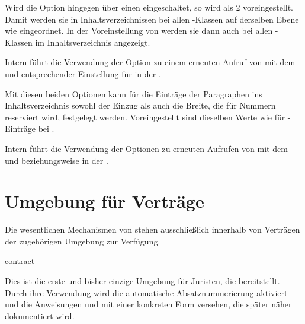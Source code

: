 Wird die Option hingegen über einen
 eingeschaltet,
so wird als  2 voreingestellt. Damit werden sie in
Inhaltsverzeichnissen bei allen \KOMAScript-Klassen auf derselben Ebene wie
%
 eingeordnet. In der
Voreinstellung von  werden sie dann auch bei
allen \KOMAScript-Klassen im Inhaltsverzeichnis angezeigt.

Intern führt die Verwendung der Option zu
einem erneuten Aufruf von
mit dem   und entsprechender Einstellung für
 in der .%
\EndIndexGroup


\begin{Declaration}
\end{Declaration}
Mit diesen beiden Optionen kann für die Einträge der Paragraphen ins
Inhaltsverzeichnis sowohl der Einzug als auch die Breite, die für Nummern
reserviert wird, festgelegt werden. Voreingestellt
sind dieselben Werte wie für
-Einträge%
 bei .

Intern führt die Verwendung der Optionen
zu erneuten Aufrufen von
 mit
dem   und 
beziehungsweise  in der
.%
\EndIndexGroup


\section{Umgebung für Verträge}
\label{sec:scrjura.contract}

\BeginIndexGroup
{}
Die wesentlichen Mechanismen von  stehen ausschließlich
innerhalb von Verträgen der zugehörigen Umgebung zur Verfügung.

\begin{Declaration}
  \begin{Environment}{contract}\end{Environment}
\end{Declaration}
Dies ist die erste und bisher einzige Umgebung für Juristen, die
 bereitstellt. Durch ihre Verwendung wird die automatische
Absatznummerierung aktiviert und die Anweisungen
 und  mit
einer konkreten Form versehen, die später näher dokumentiert wird.


